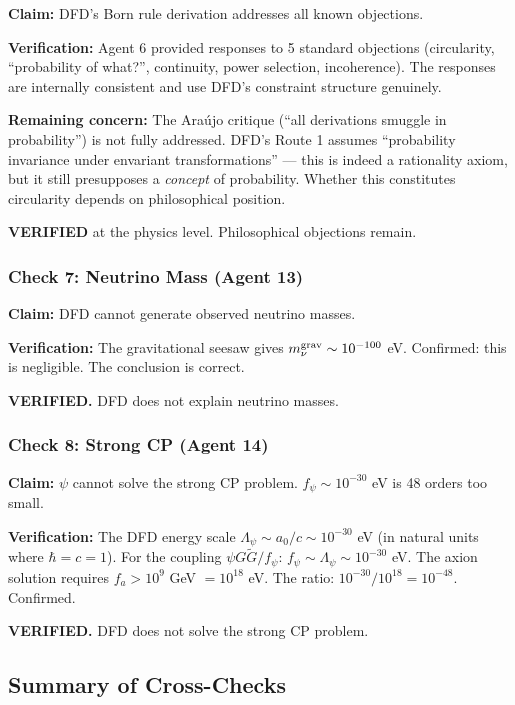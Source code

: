 \documentclass[11pt,a4paper]{article}
\begin{document}
\textbf{Claim:} DFD's Born rule derivation addresses all known objections.

\textbf{Verification:} Agent 6 provided responses to 5 standard objections (circularity, ``probability of what?'', continuity, power selection, incoherence). The responses are internally consistent and use DFD's constraint structure genuinely.

\textbf{Remaining concern:} The Ara\'ujo critique (``all derivations smuggle in probability'') is not fully addressed. DFD's Route 1 assumes ``probability invariance under envariant transformations'' --- this is indeed a rationality axiom, but it still presupposes a \emph{concept} of probability. Whether this constitutes circularity depends on philosophical position.

\textcolor{dfdgreen}{\textbf{VERIFIED}} at the physics level. Philosophical objections remain.

\subsubsection{Check 7: Neutrino Mass (Agent 13)}

\textbf{Claim:} DFD cannot generate observed neutrino masses.

\textbf{Verification:} The gravitational seesaw gives $m_\nu^{\rm grav} \sim 10^{-100}$ eV. Confirmed: this is negligible. The conclusion is correct.

\textcolor{dfdgreen}{\textbf{VERIFIED.}} DFD does not explain neutrino masses.

\subsubsection{Check 8: Strong CP (Agent 14)}

\textbf{Claim:} $\psi$ cannot solve the strong CP problem. $f_\psi \sim 10^{-30}$ eV is 48 orders too small.

\textbf{Verification:} The DFD energy scale $\Lambda_\psi \sim a_0/c \sim 10^{-30}$ eV (in natural units where $\hbar = c = 1$). For the coupling $\psi G\tilde{G}/f_\psi$: $f_\psi \sim \Lambda_\psi \sim 10^{-30}$ eV. The axion solution requires $f_a > 10^9$ GeV $= 10^{18}$ eV. The ratio: $10^{-30}/10^{18} = 10^{-48}$. Confirmed.

\textcolor{dfdgreen}{\textbf{VERIFIED.}} DFD does not solve the strong CP problem.

\subsection{Summary of Cross-Checks}
\end{document}
